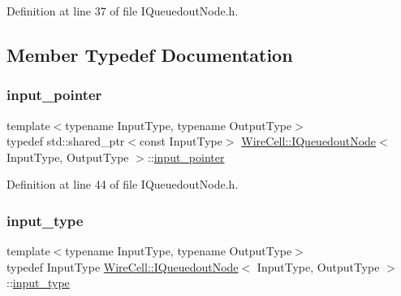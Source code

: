 Definition at line 37 of file I\+Queuedout\+Node.\+h.



\subsection{Member Typedef Documentation}
\mbox{\label{class_wire_cell_1_1_i_queuedout_node_acf5f716a764553f3c7055a9cf67e906e}} 
\subsubsection{\texorpdfstring{input\+\_\+pointer}{input\_pointer}}
{\footnotesize\ttfamily template$<$typename Input\+Type, typename Output\+Type$>$ \\
typedef std\+::shared\+\_\+ptr$<$const Input\+Type$>$ \hyperlink{class_wire_cell_1_1_i_queuedout_node}{Wire\+Cell\+::\+I\+Queuedout\+Node}$<$ Input\+Type, Output\+Type $>$\+::\hyperlink{class_wire_cell_1_1_i_queuedout_node_acf5f716a764553f3c7055a9cf67e906e}{input\+\_\+pointer}}



Definition at line 44 of file I\+Queuedout\+Node.\+h.

\mbox{\label{class_wire_cell_1_1_i_queuedout_node_aa0501633b9a10015ab9f84852e045e30}} 
\subsubsection{\texorpdfstring{input\+\_\+type}{input\_type}}
{\footnotesize\ttfamily template$<$typename Input\+Type, typename Output\+Type$>$ \\
typedef Input\+Type \hyperlink{class_wire_cell_1_1_i_queuedout_node}{Wire\+Cell\+::\+I\+Queuedout\+Node}$<$ Input\+Type, Output\+Type $>$\+::\hyperlink{class_wire_cell_1_1_i_queuedout_node_aa0501633b9a10015ab9f84852e045e30}{input\+\_\+type}}



